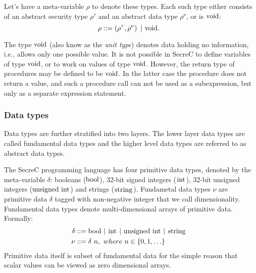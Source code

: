\documentclass[a4paper, 10pt, draft]{report}
\newcommand{\mycode}[1]{\ensuremath{\mbox{\lstinline{#1}}}}
\begin{document}
Let's have a meta-variable $\rho$ to denote these types. Each such type either
consists of an abstract security type $\rho^\tau$ and an abstract data type
$\rho^\nu$, or is \mycode{void}:
\[
  \rho ::= \left( \rho^\tau, \rho^\nu \right)\ |\ \mycode{void}.
\]

The type \mycode{void} (also know as the \textit{unit type}) denotes data
holding no information, i.e., allows only one possible value. It is not possible
in SecreC to define variables of type \mycode{void}, or to work on values of
type \mycode{void}. However, the return type of procedures may be defined to be
\mycode{void}. In the latter case the procedure does not return a value, and
such a procedure call can not be used as a subexpression, but only as a
separate expression statement.

\subsubsection{Data types}
Data types are further stratified into two layers. The lower layer data types
are called fundamental data types and the higher level data types are referred
to as abstract data types.

The SecreC programming language has four primitive data types, denoted by the
meta-variable $\delta$: booleans (\mycode{bool}), 32-bit signed integers
(\mycode{int}), 32-bit unsigned integers (\mycode{unsigned int}) and strings
(\mycode{string}). Fundametal data types $\nu$ are primitive data $\delta$
tagged with non-negative integer that we call dimensionality. Fundamental data
types denote multi-dimensional arrays of primitive data. Formally:
\begin{align*}
  \delta & ::= \mycode{bool}\ |\ \mycode{int}\ |\ \mycode{unsigned int}\ |\ \mycode{string} \\
  \nu & ::= \delta\ n,\ {where}\ n \in \left\{ 0, 1, \ldots \right\}
\end{align*}
Primitive data itself is subset of fundamental data for the simple reason that
scalar values can be viewed as zero dimensional arrays.
\end{document}
